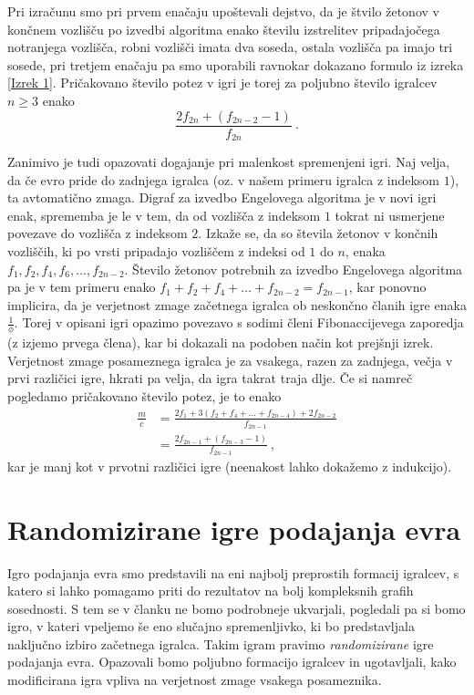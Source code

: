 \documentclass[twoside,11pt]{article}
\begin{document}
Pri izračunu smo pri prvem enačaju upoštevali dejstvo, da je štvilo žetonov v končnem vozlišču po izvedbi algoritma enako številu izstrelitev pripadajočega notranjega vozlišča, robni vozlišči imata dva soseda, ostala vozlišča pa imajo tri sosede, pri tretjem enačaju pa smo uporabili ravnokar dokazano formulo iz izreka \ref{Izrek 1}.
Pričakovano število potez v igri je torej za poljubno število igralcev $n\ge3$ enako 
$$
\frac{2f_{2n} + (f_{2n-2}-1)}{f_{2n}} \ .
$$

Zanimivo je tudi opazovati dogajanje pri malenkost spremenjeni igri. Naj velja, da če evro pride 
do zadnjega igralca (oz.\,\,v našem primeru igralca z indeksom $1$), ta avtomatično zmaga. Digraf za izvedbo Engelovega algoritma je v novi igri enak, 
sprememba je le v tem, da od vozlišča z indeksom $1$ tokrat ni usmerjene povezave do vozlišča z indeksom $2$. 
Izkaže se, da so števila žetonov v končnih vozliščih, ki po vrsti pripadajo vozliščem z indeksi od $1$ 
do $n$, enaka $f_1,f_2,f_4,f_6,\ldots,f_{2n-2}$.
Število žetonov potrebnih za izvedbo Engelovega algoritma pa je v tem primeru enako $f_1+f_2+f_4+\ldots+f_{2n-2}=f_{2n-1}$, 
kar ponovno implicira, da je verjetnost zmage začetnega igralca ob neskončno članih igre enaka $\frac{1}{\phi}$. 
Torej v opisani igri opazimo povezavo s sodimi členi Fibonaccijevega zaporedja (z izjemo prvega člena), 
kar bi dokazali na podoben način kot prejšnji izrek.
Verjetnost zmage posameznega igralca je za vsakega, razen za zadnjega, večja v prvi različici igre, hkrati pa velja, da igra takrat traja dlje.
Če si namreč pogledamo pričakovano število potez, je to enako
\begin{align*}
    \frac{m}{c} &= \frac{2f_1 + 3(f_2+f_4+\ldots+f_{2n-4})+ 2f_{2n-2}}{f_{2n-1}} \\
    &= \frac{2f_{2n-1} + (f_{2n-3}-1)}{f_{2n-1}} \ ,
\end{align*}
kar je manj kot v prvotni različici igre (neenakost lahko dokažemo z indukcijo).

\section{Randomizirane igre podajanja evra}
Igro podajanja evra smo predstavili na eni najbolj preprostih formacij igralcev, s katero si lahko pomagamo priti do rezultatov na bolj kompleksnih grafih sosednosti. 
S tem se v članku ne bomo podrobneje ukvarjali, pogledali pa si bomo igro, v kateri vpeljemo še eno slučajno spremenljivko, ki bo predstavljala naključno izbiro začetnega igralca. Takim
igram pravimo \emph{randomizirane} igre podajanja evra. Opazovali bomo poljubno formacijo igralcev in ugotavljali, kako modificirana igra vpliva na verjetnost zmage vsakega posameznika. 
\end{document}
